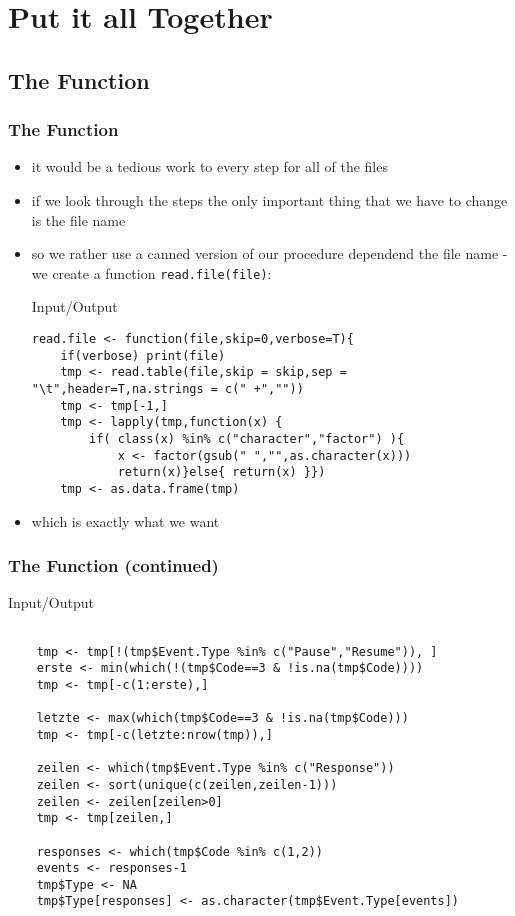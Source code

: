\documentclass[xcolor={table},c]{beamer}
\begin{document}
\section{Put it all Together}
\subsection{The Function}
\begin{frame}[fragile]\frametitle{The Function}
  \begin{itemize}
  \item it would be a tedious work to every step for all of the files
  \item if we look through the steps the only important thing that we have to change is the file name
  \item so we rather use a canned version of our procedure dependend the file name - we create a function \texttt{read.file(file)}:
  \begin{exampleblock}{Input/Output}\scriptsize
\begin{verbatim}
read.file <- function(file,skip=0,verbose=T){
    if(verbose) print(file)
    tmp <- read.table(file,skip = skip,sep = "\t",header=T,na.strings = c(" +",""))
    tmp <- tmp[-1,]
    tmp <- lapply(tmp,function(x) {
        if( class(x) %in% c("character","factor") ){
            x <- factor(gsub(" ","",as.character(x)))
            return(x)}else{ return(x) }})
    tmp <- as.data.frame(tmp)

\end{verbatim}
  \end{exampleblock}
\item which is exactly what we want
  \end{itemize}
\end{frame}

\begin{frame}[fragile]\frametitle{The Function (continued)}
  \begin{exampleblock}{Input/Output}\scriptsize
\begin{verbatim}

    tmp <- tmp[!(tmp$Event.Type %in% c("Pause","Resume")), ]
    erste <- min(which(!(tmp$Code==3 & !is.na(tmp$Code))))
    tmp <- tmp[-c(1:erste),]

    letzte <- max(which(tmp$Code==3 & !is.na(tmp$Code)))
    tmp <- tmp[-c(letzte:nrow(tmp)),]

    zeilen <- which(tmp$Event.Type %in% c("Response"))
    zeilen <- sort(unique(c(zeilen,zeilen-1)))
    zeilen <- zeilen[zeilen>0]
    tmp <- tmp[zeilen,]
    
    responses <- which(tmp$Code %in% c(1,2))
    events <- responses-1
    tmp$Type <- NA
    tmp$Type[responses] <- as.character(tmp$Event.Type[events])

\end{verbatim}
  \end{exampleblock}
\end{frame}
\end{document}

